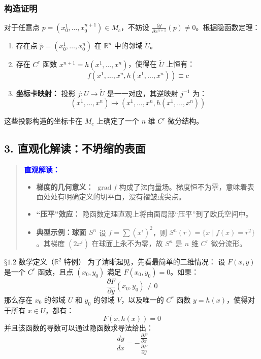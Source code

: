 \begin{myremark}
\subsubsection*{构造证明}
对于任意点 $p = (x_0^1,\dots ,x_0^{n + 1})\in M_c$，不妨设 $\frac {\partial f}{\partial x ^ {n + 1}} (p) \neq 0$。根据隐函数定理：
\begin{enumerate}
    \item 存在点 $\tilde{p} = (x_0^1,\dots ,x_0^n)$ 在 $\mathbb{R}^n$ 中的邻域 $\tilde{U}$。
    \item 存在 $C^r$ 函数 $x^{n + 1} = h(x^{1},\dots ,x^{n})$，使得在 $\tilde{U}$ 上恒有：
    \begin{equation}
    f (x ^ {1}, \dots , x ^ {n}, h (x ^ {1}, \dots , x ^ {n})) \equiv c \tag{恒等式}
    \end{equation}
    \item \textbf{坐标卡映射：} 投影 $j: U \to \tilde{U}$ 是一一对应，其逆映射 $j^{-1}$ 为：
    $$ (x ^ {1}, \dots , x ^ {n}) \longmapsto (x ^ {1}, \dots , x ^ {n}, h (x ^ {1}, \dots , x ^ {n})) $$
\end{enumerate}
这些投影构造的坐标卡在 $M_c$ 上确定了一个 $n$ 维 $C^r$ 微分结构。

\subsection*{3. 直观化解读：不坍缩的表面}

\begin{quote}
\textbf{\textcolor{blue}{直观解读：}}
\begin{itemize}
    \item \textbf{梯度的几何意义：} $\operatorname{grad} f$ 构成了法向量场。梯度恒不为零，意味着表面处处有明确定义的切平面，没有褶皱或尖点。
    \item \textbf{“压平”效应：} 隐函数定理直观上将曲面局部“压平”到了欧氏空间中。
    \item \textbf{典型示例：球面 $S^n$} 
    设 $f = \sum (x^i)^2$，则 $S^n(r) = \{x \mid f(x) = r^2\}$。其梯度 $(2x^i)$ 在球面上永不为零，故 $S^n$ 是 $n$ 维 $C^r$ 微分流形。
\end{itemize}
\end{quote}

$§1.2$ 数学定义（$\mathbb{R}^2$ 特例）
为了清晰起见，先看最简单的二维情况：
设 $F(x, y)$ 是一个 $C^r$ 函数，且点 $(x_0, y_0)$ 满足 $F(x_0, y_0) = 0$。如果：
$$\frac{\partial F}{\partial y}(x_0, y_0) \neq 0$$
那么存在 $x_0$ 的邻域 $U$ 和 $y_0$ 的邻域 $V$，以及唯一的 $C^r$ 函数 $y = h(x)$，使得对于所有 $x \in U$，都有：
$$F(x, h(x)) = 0$$
并且该函数的导数可以通过隐函数求导法给出：
$$\frac{dy}{dx} = -\frac{\frac{\partial F}{\partial x}}{\frac{\partial F}{\partial y}}$$


\end{myremark}
